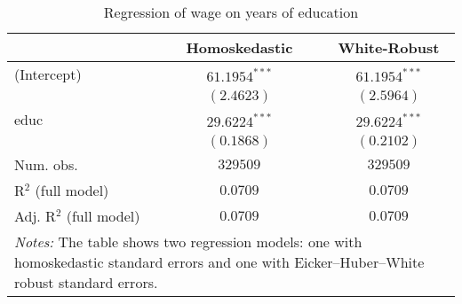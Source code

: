 
\begin{table}[h]
\begin{center}
\begin{tabular}{l c c}
\hline
 & Homoskedastic & White-Robust \\
\hline
(Intercept)             & $61.1954^{***}$ & $61.1954^{***}$ \\
                        & $(2.4623)$      & $(2.5964)$      \\
educ                    & $29.6224^{***}$ & $29.6224^{***}$ \\
                        & $(0.1868)$      & $(0.2102)$      \\
\hline
Num. obs.               & $329509$        & $329509$        \\
R$^2$ (full model)      & $0.0709$        & $0.0709$        \\
Adj. R$^2$ (full model) & $0.0709$        & $0.0709$        \\
\hline
\multicolumn{3}{l}{\scriptsize{\begin{minipage}{0.9\linewidth}\scriptsize\textit{Notes:} 
  The table shows two regression models: one with homoskedastic standard errors 
  and one with Eicker–Huber–White robust standard errors.\end{minipage}}}
\end{tabular}
\caption{Regression of wage on years of education}
\label{tab:problem_2_model}
\end{center}
\end{table}
